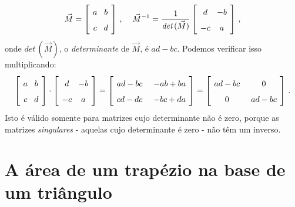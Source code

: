 \[
\spacearray
\vec{M}=\left[ \begin{array}{c} a\\c\end{array} \begin{array}{c} b\\d \end{array}\right]\,,\;\;\;\;
\vec{M}^{-1}=\frac{1}{\textit{det}\,(\vec{M})}\left[ \begin{array}{c} d\\-c\end{array} \begin{array}{c} -b\\a \end{array}\right]\,,
\]
onde $\textit{det}\,(\vec{M})$, o \emph{determinante} de $\vec{M}$, é $ad-bc$. Podemos verificar isso multiplicando:
\[
\spacearray
\left[ \begin{array}{c} a\\c\end{array} \begin{array}{c} b\\d \end{array}\right] \cdot
\left[ \begin{array}{c} d\\-c\end{array} \begin{array}{c} -b\\a \end{array}\right] =
\left[ \begin{array}{c} ad-bc\\cd-dc\end{array} \;\;\begin{array}{c} -ab+ba\\-bc+da \end{array}\right] =
\left[ \begin{array}{c}ad-bc \\0\end{array}\;\; \begin{array}{c} 0\\ad-bc \end{array}\right]\,.
\]
Isto é válido somente para matrizes cujo determinante não é zero, porque as matrizes \emph{singulares} - aquelas cujo determinante é zero - não têm um inverso.

\section{A área de um trapézio na base de um triângulo}\label{a.trap}

